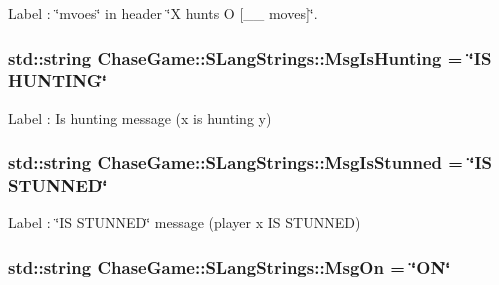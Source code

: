 Label \-: \char`\"{}mvoes\char`\"{} in header \char`\"{}\-X hunts O \mbox{[}\-\_\-\-\_\- moves\mbox{]}\char`\"{}. 

\hypertarget{struct_chase_game_1_1_s_lang_strings_ae186b81b6002ed3e2d795e5adecca95e}{
\subsubsection[{Msg\-Is\-Hunting}]{\setlength{\rightskip}{0pt plus 5cm}std\-::string Chase\-Game\-::\-S\-Lang\-Strings\-::\-Msg\-Is\-Hunting = \char`\"{}I\-S H\-U\-N\-T\-I\-N\-G\char`\"{}}}\label{struct_chase_game_1_1_s_lang_strings_ae186b81b6002ed3e2d795e5adecca95e}


Label \-: Is hunting message (x is hunting y) 

\hypertarget{struct_chase_game_1_1_s_lang_strings_a971954b51dcf006eb0ff2291be037a5c}{
\subsubsection[{Msg\-Is\-Stunned}]{\setlength{\rightskip}{0pt plus 5cm}std\-::string Chase\-Game\-::\-S\-Lang\-Strings\-::\-Msg\-Is\-Stunned = \char`\"{}I\-S S\-T\-U\-N\-N\-E\-D\char`\"{}}}\label{struct_chase_game_1_1_s_lang_strings_a971954b51dcf006eb0ff2291be037a5c}


Label \-: \char`\"{}\-I\-S S\-T\-U\-N\-N\-E\-D\char`\"{} message (player x I\-S S\-T\-U\-N\-N\-E\-D) 

\hypertarget{struct_chase_game_1_1_s_lang_strings_af30da50d583af601645117d472aace34}{
\subsubsection[{Msg\-On}]{\setlength{\rightskip}{0pt plus 5cm}std\-::string Chase\-Game\-::\-S\-Lang\-Strings\-::\-Msg\-On = \char`\"{}O\-N\char`\"{}}}\label{struct_chase_game_1_1_s_lang_strings_af30da50d583af601645117d472aace34}


